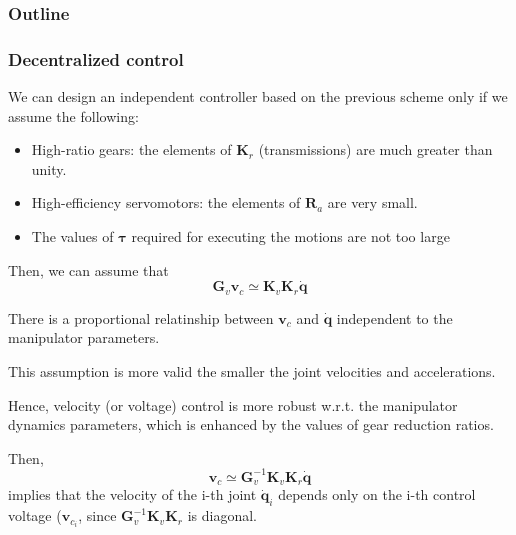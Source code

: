 \documentclass[10pt, aspectratio=169]{beamer}
\theoremstyle{remark}
\theoremstyle{definition}
\begin{document}
\begin{frame}
	\frametitle{Outline} %
\end{frame}

\begin{frame}[allowframebreaks]
\frametitle{Decentralized control}

    We can design an independent controller based on the previous scheme only if we assume the following:

    \begin{itemize}
        \item High-ratio gears: the elements of $\mathbf{K}_r$ (transmissions) are much greater than unity. 
        \item High-efficiency servomotors: the elements of $\mathbf{R}_a$ are very small.
        \item The values of $\boldsymbol{\tau}$ required for executing the motions are not too large
    \end{itemize}

    Then, we can assume that
    \begin{equation}
        \mathbf{G}_v\mathbf{v}_c \simeq \mathbf{K}_v\mathbf{K}_r\dot{\mathbf{q}}
        \label{eq:approx_decentralized_control}
    \end{equation}
    
    There is a proportional relatinship between $\mathbf{v}_c$ and $\dot{\mathbf{q}}$ independent to the manipulator parameters. 

    \framebreak
    
    This assumption is more valid the smaller the joint velocities and accelerations.

    Hence, velocity (or voltage) control is more robust w.r.t. the manipulator dynamics parameters, which is enhanced by the values of gear reduction ratios.

    Then, 
    $$
    \mathbf{v}_c \simeq \mathbf{G}_v^{-1}\mathbf{K}_v\mathbf{K}_r\dot{\mathbf{q}}
    $$
    implies that the velocity of the i-th joint $\dot{\mathbf{q}}_i$ depends only on the i-th control voltage ($\mathbf{v}_{c_i}$, since $\mathbf{G}_v^{-1}\mathbf{K}_v\mathbf{K}_r$ is diagonal.


\end{frame}
\end{document}
